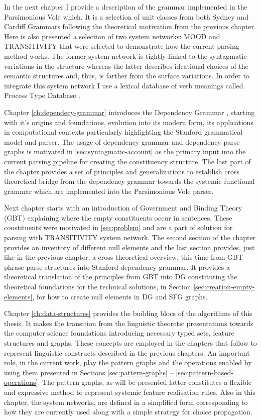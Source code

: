 In the next chapter I provide a description of the grammar implemented in the Parsimonious Vole which. It is a selection of unit classes from both Sydney and Cardiff Grammars following the theoretical motivation from the previous chapter. Here is also presented a selection of two system networks: MOOD and TRANSITIVITY that were selected to demonstrate how the current parsing method works. The former system network is tightly linked to the syntagmatic variations in the structure whereas the latter describes ideational choices of the semantic structures and, thus, is farther from the surface variations. In order to integrate this system network I use a lexical database of verb meanings called Process Type Database \citet{Neale2002}. 

Chapter \ref{ch:dependecy-grammar} introduces the Dependency Grammar \citeyear{Tesniere59}, starting with it's origins and foundations, evolution into its modern form, its applications in computational contexts particularly highlighting the Stanford grammatical model and parser. The usage of dependency grammar and dependency parse graphs is motivated in \ref{sec:syntagmatic-account} as the primary input into the current parsing pipeline for creating the constituency structure. The last part of the chapter provides a set of principles and generalizations to establish cross theoretical bridge from the dependency grammar towards the systemic functional grammar which are implemented into the Parsimonious Vole parser. 


Next chapter starts with an introduction of Government and Binding Theory (GBT) explaining where the empty constituents occur in sentences. These constituents were motivated in \ref{sec:problem} and are a part of solution for parsing with TRANSITIVITY system network. The second section of the chapter provides an inventory of different null elements and the last section provides, just like in the previous chapter, a cross theoretical overview, this time from GBT phrase parse structures into Stanford dependency grammar. It provides a theoretical translation of the principles from GBT into DG constituting the theoretical foundations for the technical solutions, in Section \ref{sec:creation-empty-elements}, for how to create null elements in DG and SFG graphs. 


Chapter \ref{ch:data-structures} provides the building blocs of the algorithms of this thesis. It makes the transition from the linguistic theoretic presentations towards the computer science foundations introducing necessary typed sets, feature structures and graphs. These concepts are employed in the chapters that follow to represent linguistic constructs described in the previous chapters. An important role, in the current work, play the pattern graphs and the operations enabled by using them presented in Sections \ref{sec:pattern-graphs} -- \ref{sec:pattern-based-operations}. 
The pattern graphs, as will be presented latter constitutes a flexible and expressive method to represent systemic feature realisation rules. Also in this chapter, the system networks, are defined in a simplified form corresponding to how they are currently used along with a simple strategy for choice propagation. 

